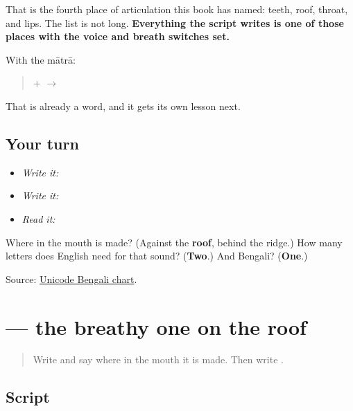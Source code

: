 That is the fourth place of articulation this book has named: teeth, roof, throat, and lips. The list is not long. \textbf{Everything the script writes is one of those places with the voice and breath switches set.}

With the mātrā:

\begin{quote}
\textbf{} + \textbf{} $\to$ \textbf{}
\end{quote}

That is already a word, and it gets its own lesson next.

\subsection*{Your turn}
\begin{itemize}
\raggedright
  \item \emph{Write it:} 
  \item \emph{Write it:} 
  \item \emph{Read it:}  
\end{itemize}

\begin{tcolorbox}[breakable,colback=teal!4,colframe=teal!35!black,title={Before you move on}]
Where in the mouth is \textbf{} made? (Against the \textbf{roof}, behind the ridge.) How many letters does English need for that sound? (\textbf{Two}.) And Bengali? (\textbf{One}.)

Source: \href{https://www.unicode.org/charts/PDF/U0980.pdf}{Unicode Bengali chart}.
\end{tcolorbox}
\section[\texorpdfstring{\bn{ছ} (chhô)}{ছ (chhô)}]{ — the breathy one on the roof}

\label{lesson:BN-W04-chha}



\begin{quote}
Write \textbf{} and say where in the mouth it is made. Then write \textbf{}.
\end{quote}

\subsection*{Script}

